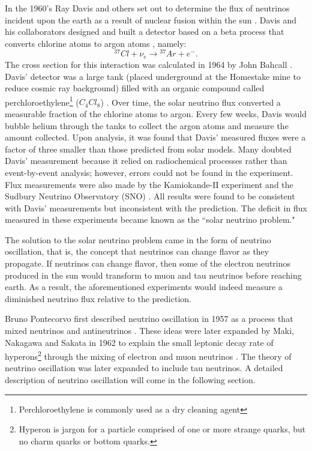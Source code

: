 In the 1960's Ray Davis and others set out to determine the flux of neutrinos
incident upon the earth as a result of nuclear fusion within the sun
\cite{davis}.  Davis
and his collaborators designed and built a detector based on a beta process
that converts chlorine atoms to argon atoms , namely:
\begin{equation}\label{nuChlorCap}
{}^{37}Cl + \nu_e  \rightarrow {}^{37}Ar + e^-.
\end{equation}
The cross section for this interaction was calculated in 1964 by John Bahcall
\cite{bahcall}.  Davis' detector was a large tank (placed underground at the
Homestake mine to reduce cosmic ray background) filled with an organic compound
called perchloroethylene\footnote{Perchloroethylene is commonly used as
a dry cleaning agent} ($C_4Cl_8$)  \cite{davis}.
Over time, the solar
neutrino flux converted a measurable fraction of the chlorine atoms to argon.
Every few weeks, Davis would bubble helium through the tanks to collect the
argon atoms and measure the amount collected.  Upon analysis, it was found that
Davis' measured fluxes were a factor of three smaller than those predicted from
solar models.  Many doubted Davis' measurement because it relied on
radiochemical processes rather than event-by-event analysis; however, errors
could not be found in the experiment.  Flux measurements were also made by the
Kamiokande-II experiment and the Sudbury Neutrino Observatory (SNO)
\cite{kamiokande, sno}.
All results were found to be consistent with Davis' measurements but
inconsistent with the prediction.  The deficit in flux measured in these
experiments became known as the ``solar neutrino problem."


The solution to the solar neutrino problem came in the form of neutrino
oscillation, that is, the concept that neutrinos can change flavor as they
propagate.  If neutrinos can change flavor, then some of the electron neutrinos
produced in the sun would transform to muon and tau neutrinos before reaching
earth.  As a result, the aforementioned experiments would indeed measure a
diminished neutrino flux relative to the prediction.

Bruno Pontecorvo first described neutrino oscillation in 1957 as a process
that mixed neutrinos and antineutrinos  \cite{pontecorvo}.  These ideas were
later expanded by Maki, Nakagawa and Sakata in 1962 to explain the small
leptonic decay rate of hyperons\footnote{Hyperon is jargon for a particle
comprised of
one or more strange quarks, but no charm quarks or bottom quarks.} through the
mixing of electron and muon neutrinos \cite{maki1962remarks}.  The theory of
neutrino oscillation was
later expanded to include tau neutrinos.  A detailed description of neutrino
oscillation will come in the following section.


